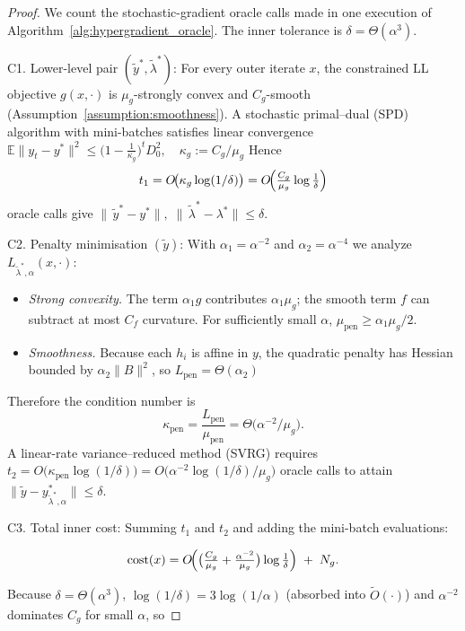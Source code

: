 \documentclass[letterpaper]{article} %
\newcommand{\EE}{\mathbb{E}}
\newcommand{\1}{\mathbf{1}}
\begin{document}
\innercost*
\begin{proof}
We count the stochastic-gradient oracle calls made in one execution of
Algorithm~\ref{alg:hypergradient_oracle}.  
The inner tolerance is $\delta=\Theta(\alpha^{3})$.

C1.  Lower-level pair $(\tilde y^{*},\tilde\lambda^{*})$:
For every outer iterate $x$, the constrained LL objective
$g(x,\cdot)$ is $\mu_{g}$-strongly convex and $C_{g}$-smooth
(Assumption~\ref{assumption:smoothness}).  
A stochastic primal–dual (SPD) algorithm with mini-batches satisfies
linear convergence  
\(
\EE\|y_{t}-y^{*}\|^{2}\le
\bigl(1-\tfrac1{\kappa_{g}}\bigr)^{t}\!D_{0}^{2},
\quad
\kappa_{g}:=C_{g}/\mu_{g}
\)
Hence
\[
t_{1}=O\!\bigl(\kappa_{g}\log(1/\delta)\bigr)
=O\!\Bigl(\tfrac{C_{g}}{\mu_{g}}\log\tfrac1\delta\Bigr)
\]
oracle calls give
$\|\,\tilde y^{*}-y^{*}\|,\;
\|\,\tilde\lambda^{*}-\lambda^{*}\|\le\delta$.

C2. Penalty minimisation $(\tilde y)$: With $\alpha_{1}=\alpha^{-2}$ and $\alpha_{2}=\alpha^{-4}$ we analyze
$L_{\tilde\lambda^{*},\alpha}(x,\cdot)$:

\begin{itemize}
\item \textit{Strong convexity.}  
The term $\alpha_{1}g$ contributes $\alpha_{1}\mu_{g}$;
the smooth term $f$ can subtract at most $C_{f}$ curvature.
For sufficiently small $\alpha$,
$\mu_{\mathrm{pen}}\ge\alpha_{1}\mu_{g}/2$.
\item \textit{Smoothness.}  
Because each $h_{i}$ is affine in $y$,
the quadratic penalty has Hessian bounded by
$\alpha_{2}\|B\|^{2}$, so
$L_{\mathrm{pen}}=\Theta(\alpha_{2})$
\end{itemize}

Therefore the condition number is
\[
\kappa_{\mathrm{pen}}
=\frac{L_{\mathrm{pen}}}{\mu_{\mathrm{pen}}}
=\Theta\!\bigl(\alpha^{-2}/\mu_{g}\bigr).
\]
A linear-rate variance–reduced method (SVRG) requires
$t_{2}=O\!\bigl(\kappa_{\mathrm{pen}}\log(1/\delta)\bigr)
=O\!\bigl(\alpha^{-2}\log(1/\delta)/\mu_{g}\bigr)$
oracle calls to attain
$\|\tilde y-y^{*}_{\tilde\lambda^{*},\alpha}\|\le\delta$\cite{PMLR-SVRG2013}.                  

C3. Total inner cost: Summing $t_{1}$ and $t_{2}$ and adding the mini-batch evaluations:

\[
\text{cost}(x)
=O\!\Bigl(
\bigl(\tfrac{C_{g}}{\mu_{g}}
+\tfrac{\alpha^{-2}}{\mu_{g}}\bigr)
\log\tfrac1\delta
\Bigr)
\;+\;
N_{g}.
\]

Because $\delta=\Theta(\alpha^{3})$,
$\log(1/\delta)=3\log(1/\alpha)$ (absorbed into  $\tilde O(\cdot)$) and $\alpha^{-2}$ dominates $C_{g}$ for
small $\alpha$, so


\end{proof}
\end{document}
